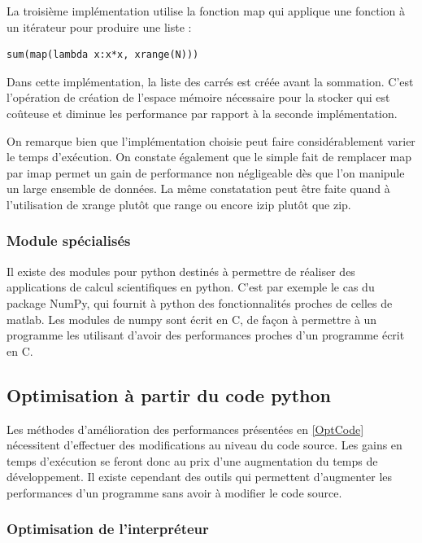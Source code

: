 \documentclass[a4paper]{article}
\begin{document}
La troisième implémentation utilise la fonction map qui applique une
fonction à un itérateur pour produire une liste :

\begin{verbatim}
sum(map(lambda x:x*x, xrange(N)))
\end{verbatim}

Dans cette implémentation, la liste des carrés est créée avant la
sommation. C'est l'opération de création de l'espace mémoire
nécessaire pour la stocker qui est coûteuse et diminue les performance
par rapport à la seconde implémentation.

On remarque bien que l'implémentation choisie peut faire
considérablement varier le temps d'exécution. On constate également
que le simple fait de remplacer map par imap permet un gain de
performance non négligeable dès que l'on manipule un large ensemble de
données. La même constatation peut être faite quand à l'utilisation de
xrange plutôt que range ou encore izip plutôt que zip.

\subsubsection{Module spécialisés}

Il existe des modules pour python destinés à permettre de réaliser des
applications de calcul scientifiques en python.  C'est par exemple le
cas du package NumPy, qui fournit à python des fonctionnalités proches
de celles de matlab. Les modules de numpy sont écrit en C, de façon à
permettre à un programme les utilisant d'avoir des performances
proches d'un programme écrit en C\cite{NumPyPerf}.

\subsection{Optimisation à partir du code python}

Les méthodes d'amélioration des performances présentées en
\ref{OptCode} nécessitent d'effectuer des modifications au niveau du
code source. Les gains en temps d'exécution se feront donc au prix
d'une augmentation du temps de développement. Il existe cependant des
outils qui permettent d'augmenter les performances d'un programme sans
avoir à modifier le code source.

\subsubsection{Optimisation de l'interpréteur}
\end{document}
